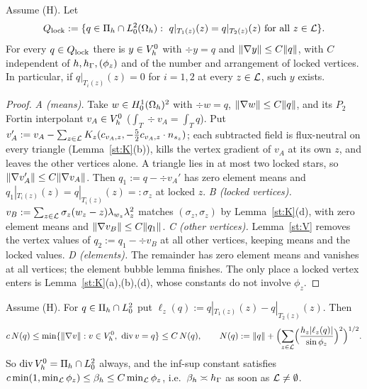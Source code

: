 \begin{theorem}\label{st:thmL}
Assume (H). Let
\[
\Ql:=\{q\in\Pih\cap L^2_0(\Oh):\ q|_{T_1(z)}(z)=q|_{T_2(z)}(z)\ \text{for all }z\in\Lk\}.
\]
For every $q\in Q_{\mathrm{lock}}$ there is $y\in V_h^0$ with $\div y=q$ and $\lVert \nabla y\rVert\le C\lVert q\rVert$, with $C$ independent of $h,h_\Gamma,(\phi_z)$ and of the number and arrangement of locked vertices. In particular, if $q|_{T_i(z)}(z)=0$ for $i=1,2$ at every $z\in\mathcal L$, such $y$ exists.
\end{theorem}

\begin{proof}
\emph{A (means).} Take $w\in H^1_0(\Omega_h)^2$ with $\div w=q$, $\lVert \nabla w\rVert\le C\lVert q\rVert$, and its $P_2$ Fortin interpolant $v_A\in V_h^0$ ($\int_T\div v_A=\int_Tq$). Put $v_A':=v_A-\sum_{z\in\mathcal L}K_z(c_{v_A,z},-\frac52c_{v_A,z}\cdot n_{s_z})$; each subtracted field is flux-neutral on every triangle (Lemma~\ref{st:K}(b)), kills the vertex gradient of $v_A$ at its own $z$, and leaves the other vertices alone. A triangle lies in at most two locked stars, so $\lVert \nabla v_A'\rVert\le C\lVert \nabla v_A\rVert$. Then $q_1:=q-\div v_A'$ has zero element means and $q_1|_{T_i(z)}(z)=q|_{T_i(z)}(z)=:\sigma_z$ at locked $z$.
\emph{B (locked vertices).} $v_B:=\sum_{z\in\mathcal L}\sigma_z(w_z-z)\lambda_{w_z}\lambda_z^2$ matches $(\sigma_z,\sigma_z)$ by Lemma~\ref{st:K}(d), with zero element means and $\lVert \nabla v_B\rVert\le C\lVert q_1\rVert$.
\emph{C (other vertices).} Lemma~\ref{st:V} removes the vertex values of $q_2:=q_1-\div v_B$ at all other vertices, keeping means and the locked values.
\emph{D (elements).} The remainder has zero element means and vanishes at all vertices; the element bubble lemma finishes.
The only place a locked vertex enters is Lemma~\ref{st:K}(a),(b),(d), whose constants do not involve $\phi_z$.
\end{proof}

\begin{theorem}\label{st:sharp}
Assume (H). For $q\in\Pi_h\cap L^2_0$ put $\ell_z(q):=q|_{T_1(z)}(z)-q|_{T_2(z)}(z)$. Then
\[
c\,N(q)\le\min\{\lVert \nabla v\rVert:v\in V_h^0,\ \operatorname{div} v=q\}\le C\,N(q),\qquad
N(q):=\lVert q\rVert+\Bigl(\sum_{z\in\mathcal L}\Bigl(\frac{h_z|\ell_z(q)|}{\sin\phi_z}\Bigr)^2\Bigr)^{1/2}.
\]
So $\operatorname{div}V_h^0=\Pi_h\cap L^2_0$ always, and the inf-sup constant satisfies $c\min(1,\min_{\mathcal L}\phi_z)\le\beta_h\le C\min_{\mathcal L}\phi_z$, i.e.\ $\beta_h\asymp h_\Gamma$ as soon as $\mathcal L\ne\emptyset$.
\end{theorem}


